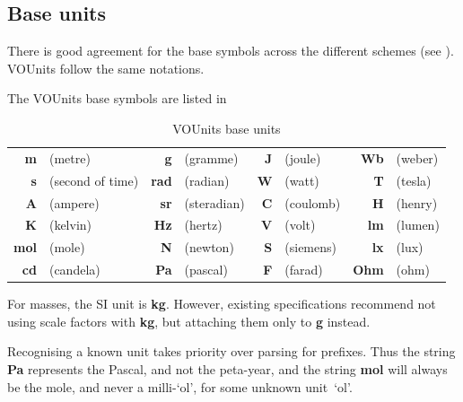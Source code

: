 \documentclass[11pt,notitlepage,onecolumn]{ivoa}
\newcommand{\unit}[1]{\textbf{\textsf{\color{orange}#1}}}
\begin{document}
\subsection{Base units\label{sec:baseUnits}}

There is good agreement for the base symbols across the different schemes
(see ).  VOUnits follow the same notations.

The VOUnits base symbols are listed in 

\begin{table}[ht]
\begin{center}
\def\arraystretch{1.2}
\begin{tabular}{|rl|rl|rl|rl|}\hline
\unit{m}&(metre)		&\unit{g}&(gramme) 	&\unit{J}&(joule)     	&\unit{Wb}&(weber)\\
\unit{s}&(second of time)	&\unit{rad}&(radian)    &\unit{W}&(watt) 	&\unit{T}&(tesla)\\
\unit{A}&(ampere)		&\unit{sr}&(steradian)  &\unit{C}&(coulomb)	&\unit{H}&(henry)\\
\unit{K}&(kelvin)		&\unit{Hz}&(hertz)      &\unit{V}&(volt) 	&\unit{lm}&(lumen)\\
\unit{mol}&(mole)		&\unit{N}&(newton)      &\unit{S}&(siemens)	&\unit{lx}&(lux)\\
\unit{cd}&(candela)		&\unit{Pa}&(pascal)     &\unit{F}&(farad)	&\unit{Ohm}&(ohm)\\\hline
\end{tabular}
\end{center}
\caption{\label{tab:voubase}VOUnits base units}
\end{table}

For masses, the SI unit is \unit{kg}. However, existing specifications
recommend not using scale factors with \unit{kg}, but attaching them
only to \unit{g} instead.


Recognising a known unit takes priority over parsing for prefixes.
Thus the string \unit{Pa} represents the Pascal, and not the
peta-year, and the string \unit{mol} will always be the mole, and
never a milli-`ol', for some unknown unit~`ol'.
\end{document}
